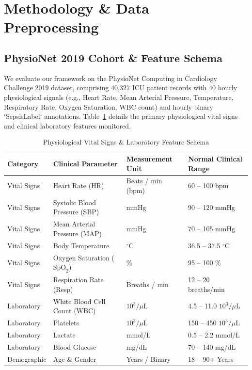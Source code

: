 \documentclass[conference]{IEEEtran}
\begin{document}
\section{Methodology \& Data Preprocessing}
\subsection{PhysioNet 2019 Cohort \& Feature Schema}
We evaluate our framework on the PhysioNet Computing in Cardiology Challenge 2019 dataset, comprising 40,327 ICU patient records with 40 hourly physiological signals (e.g., Heart Rate, Mean Arterial Pressure, Temperature, Respiratory Rate, Oxygen Saturation, WBC count) and hourly binary `SepsisLabel` annotations. Table~\ref{tab:vitals_schema} details the primary physiological vital signs and clinical laboratory features monitored.

\begin{table}[t]
\caption{Physiological Vital Signs \& Laboratory Feature Schema}
\label{tab:vitals_schema}
\centering
\small
\setlength{\tabcolsep}{6pt}
\begin{tabular}{llll}
\toprule
\textbf{Category} & \textbf{Clinical Parameter} & \textbf{Measurement Unit} & \textbf{Normal Clinical Range} \\
\midrule
Vital Signs & Heart Rate (HR) & Beats / min (bpm) & 60 -- 100 bpm \\
Vital Signs & Systolic Blood Pressure (SBP) & mmHg & 90 -- 120 mmHg \\
Vital Signs & Mean Arterial Pressure (MAP) & mmHg & 70 -- 105 mmHg \\
Vital Signs & Body Temperature & $^\circ$C & 36.5 -- 37.5 $^\circ$C \\
Vital Signs & Oxygen Saturation ($\text{SpO}_2$) & \% & 95 -- 100 \% \\
Vital Signs & Respiration Rate (Resp) & Breaths / min & 12 -- 20 breaths/min \\
Laboratory & White Blood Cell Count (WBC) & $10^3/\mu\text{L}$ & 4.5 -- 11.0 $10^3/\mu\text{L}$ \\
Laboratory & Platelets & $10^3/\mu\text{L}$ & 150 -- 450 $10^3/\mu\text{L}$ \\
Laboratory & Lactate & mmol/L & 0.5 -- 2.2 mmol/L \\
Laboratory & Blood Glucose & mg/dL & 70 -- 140 mg/dL \\
Demographic & Age \& Gender & Years / Binary & 18 -- 90+ Years \\
\bottomrule
\end{tabular}
\end{table}
\end{document}
